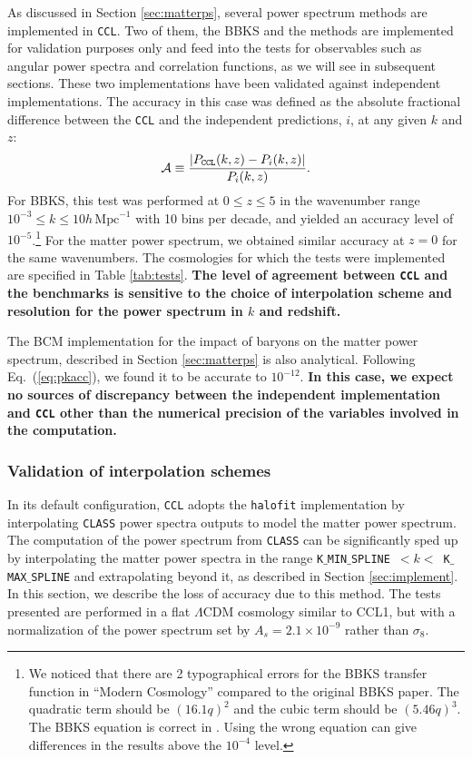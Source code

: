 \documentclass[\docopts]{\docclass}
\newcommand{\ccl}{{\tt CCL}\xspace}
\newcommand{\halofit}{{\tt halofit}\xspace}
\newcommand{\class}{{\tt CLASS}\xspace}
\begin{document}
As discussed in Section \ref{sec:matterps}, several power spectrum methods are implemented in \ccl. Two of them, the BBKS \citep{BBKS} and the \citet{1998ApJ...496..605E} methods are implemented for validation purposes only and feed into the tests for observables such as angular power spectra and correlation functions, as we will see in subsequent sections. These two implementations have been validated against independent implementations. The accuracy in this case was defined as the absolute fractional difference between the \ccl and the independent predictions, $i$, at any given $k$ and $z$:
\begin{equation}
  \mathcal{A}\equiv \frac{|P_{\tt CCL}(k,z)-P_{i}(k,z)|}{P_i(k,z)}.
  \label{eq:pkacc}
\end{equation}
For BBKS, this test was performed at $0\leq z \leq 5$ in the wavenumber range $10^{-3} \leq k \leq 10 h\,\text{Mpc}^{-1}$ with 10 bins per decade, and yielded an accuracy level of $10^{-5}$.\footnote{We noticed that there are 2 typographical errors for the BBKS transfer function in ``Modern Cosmology'' \citep{DodelsonBook} compared to the original BBKS paper. The quadratic term should be $(16.1q)^2$ and the cubic term should be $(5.46q)^3$. The BBKS equation is correct in \citet{PeacockBook}. Using the wrong equation can give differences in the results above the $10^{-4}$ level.}
For the \citet{1998ApJ...496..605E} matter power spectrum, we obtained similar accuracy at $z=0$ for the same wavenumbers. The cosmologies for which the tests were implemented are specified in Table \ref{tab:tests}. {\bf The level of agreement between \ccl and the benchmarks is sensitive to the choice of interpolation scheme and resolution for the power spectrum in $k$ and redshift.}

The BCM implementation for the impact of baryons on the matter power spectrum, described in Section \ref{sec:matterps} is also analytical. Following Eq.~(\ref{eq:pkacc}), we found it to be accurate to $10^{-12}$. {\bf In this case, we expect no sources of discrepancy between the independent implementation and \ccl other than the numerical precision of the variables involved in the computation.}

\subsubsection{Validation of interpolation schemes}
\label{ss:classval}

In its default configuration, \ccl adopts the \halofit \citep{CLASS_halofit} implementation by interpolating \class power spectra outputs to model the matter power spectrum. The computation of the power spectrum from \class can be significantly sped up by interpolating the matter power spectra in the range {\tt K$\_$MIN$\_$SPLINE}~$<k<$~{\tt K$\_$MAX$\_$SPLINE} and extrapolating beyond it, as described in Section \ref{sec:implement}. In this section, we describe the loss of accuracy due to this method. The tests presented are performed in a flat $\Lambda$CDM cosmology similar to CCL1, but with a normalization of the power spectrum set by $A_s=2.1\times10^{-9}$ rather than $\sigma_8$.
\end{document}
